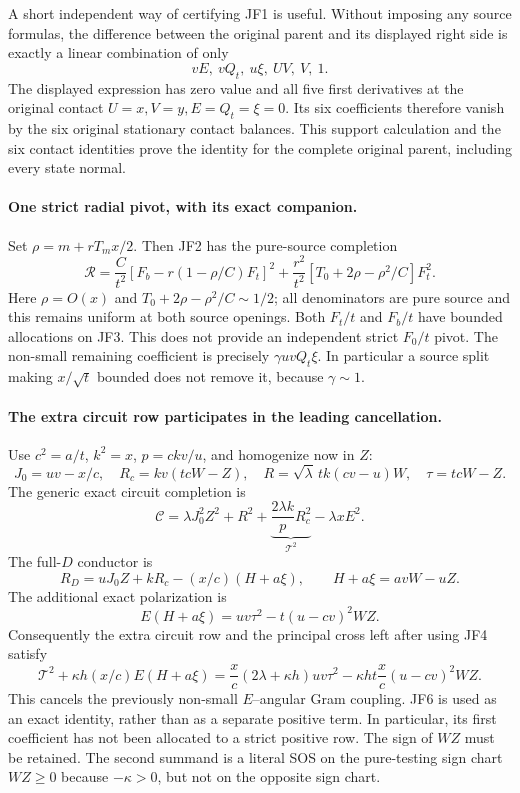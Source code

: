 A short independent way of certifying JF1 is useful. Without imposing
any source formulas, the difference between the original parent and
its displayed right side is exactly a linear combination of only
\[
                       vE,\ vQ_t,\ u\xi,\ UV,\ V,\ 1.
\]
The displayed expression has zero value and all five first derivatives
at the original contact $U=x,V=y,E=Q_t=\xi=0$.
Its six coefficients therefore vanish by the six original stationary
contact balances. This support calculation and the six contact identities
prove the identity for the complete original parent, including every state normal.

\paragraph{One strict radial pivot, with its exact companion.}
Set $\rho=m+rT_mx/2$. Then JF2 has the pure-source completion
\[
 \mathscr R=\frac C{t^2}
       [F_b-r(1-\rho/C)F_t]^2
       +\frac{r^2}{t^2}[T_0+2\rho-\rho^2/C]F_t^2.  \tag{JF3}
\]
Here $\rho=O(x)$ and $T_0+2\rho-\rho^2/C\sim1/2$;
all denominators are pure source and this remains uniform at both
source openings. Both $F_t/t$ and $F_b/t$ have bounded allocations
on JF3. This does not provide an independent strict $F_0/t$ pivot.
The non-small remaining coefficient is precisely $\gamma uvQ_t\xi$.
In particular a source split making $x/\sqrt t$ bounded does not
remove it, because $\gamma\sim1$.

\paragraph{The extra circuit row participates in the leading cancellation.}
Use $c^2=a/t$, $k^2=x$, $p=ckv/u$, and homogenize now in $Z$:
\[
 J_0=uv-x/c,\quad R_c=kv(tcW-Z),\quad
 R=\sqrt\lambda\,tk(cv-u)W,
 \quad \tau=tcW-Z.
\]
The generic exact circuit completion is
\[
 \mathscr C=\lambda J_0^2Z^2+R^2+
      \underbrace{\frac{2\lambda k}{p}R_c^2}_{\mathcal T^2}
      -\lambda xE^2.
\]
The full-$D$ conductor is
\[
 R_D=uJ_0Z+kR_c-(x/c)(H+a\xi),\qquad
 H+a\xi=avW-uZ.                                  \tag{JF4}
\]
The additional exact polarization is
\[
 E(H+a\xi)=uv\tau^2-t(u-cv)^2WZ.                  \tag{JF5}
\]
Consequently the extra circuit row and the principal cross left after
using JF4 satisfy
\[
 \mathcal T^2+\kappa h(x/c)E(H+a\xi)
 =\frac{x}{c}(2\lambda+\kappa h)uv\tau^2
      -\kappa ht\frac{x}{c}(u-cv)^2WZ.             \tag{JF6}
\]
This cancels the previously non-small $E$--angular Gram coupling.
JF6 is used as an exact identity, rather than as a separate positive
term. In particular, its first coefficient has not been allocated
to a strict positive row. The sign of $WZ$ must be retained. The second summand is a
literal SOS on the pure-testing sign chart $WZ\ge0$ because
$-\kappa>0$, but not on the opposite sign chart.

